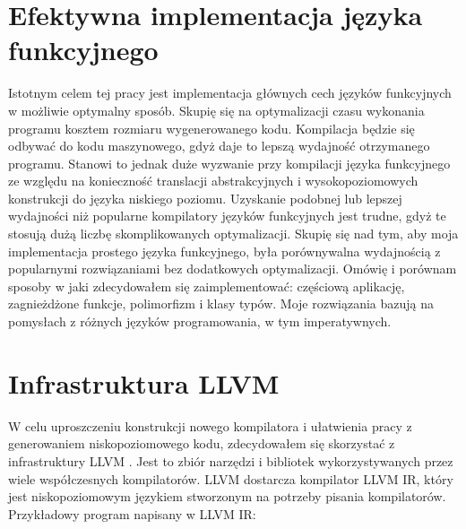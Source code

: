 \documentclass[declaration,shortabstract]{iithesis}
\begin{document}

\section{Efektywna implementacja języka funkcyjnego}

Istotnym celem tej pracy jest implementacja głównych cech języków funkcyjnych w
możliwie optymalny sposób. Skupię się na optymalizacji czasu wykonania 
programu kosztem rozmiaru wygenerowanego kodu. Kompilacja będzie się odbywać 
do kodu maszynowego, gdyż daje to lepszą wydajność otrzymanego programu. 
Stanowi to jednak duże wyzwanie przy kompilacji języka funkcyjnego ze względu 
na konieczność translacji abstrakcyjnych i wysokopoziomowych konstrukcji do 
języka niskiego poziomu. Uzyskanie 
podobnej lub lepszej wydajności niż popularne kompilatory języków funkcyjnych
jest trudne,
gdyż te stosują dużą liczbę skomplikowanych optymalizacji. Skupię się nad tym, 
aby moja implementacja prostego języka funkcyjnego, była porównywalna 
wydajnością 
z popularnymi rozwiązaniami bez dodatkowych optymalizacji. Omówię i porównam 
sposoby w jaki zdecydowałem się 
zaimplementować:
częściową aplikację, zagnieżdżone funkcje, polimorfizm i klasy typów. Moje 
rozwiązania bazują na pomysłach z różnych języków programowania, w tym 
imperatywnych. 

\section{Infrastruktura LLVM}




W celu uproszczeniu konstrukcji nowego kompilatora i ułatwienia pracy z 
generowaniem niskopoziomowego kodu, 
zdecydowałem się skorzystać z infrastruktury LLVM \cite{llvm}. 
Jest to zbiór narzędzi i bibliotek wykorzystywanych przez wiele współczesnych 
kompilatorów. LLVM dostarcza kompilator LLVM IR, który jest niskopoziomowym 
językiem stworzonym na potrzeby pisania 
kompilatorów. Przykładowy program napisany w LLVM IR:

\renewcommand{\thelstlisting}{\thesection\arabic{lstlisting}}
\end{document}
